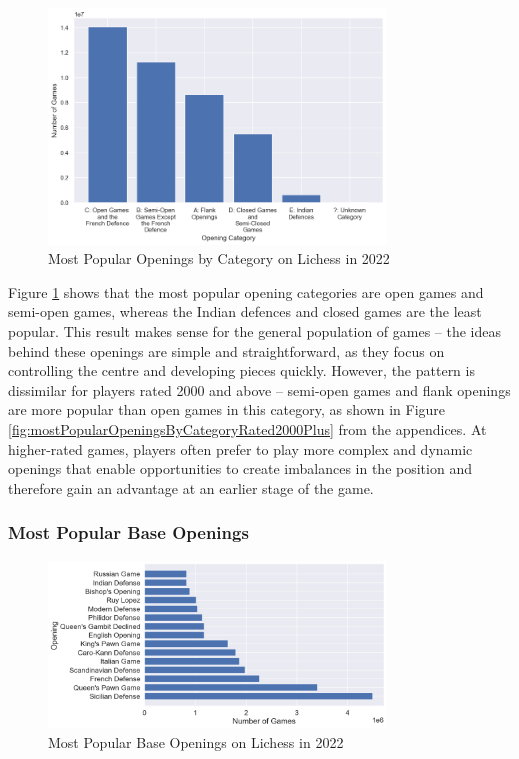 \documentclass[a4paper, 11pt]{article}
\begin{document}
\begin{figure}[H]
    \centering
    \caption{Most Popular Openings by Category on Lichess in 2022}
    \label{fig:mostPopularOpeningsByCategory}
    \includegraphics[width=0.8\textwidth]{Most Popular Openings by Category.png}
\end{figure}

Figure \ref{fig:mostPopularOpeningsByCategory} shows that the most popular opening categories are open games and semi-open games, whereas the Indian defences and closed games are the least popular. This result makes sense for the general population of games -- the ideas behind these openings are simple and straightforward, as they focus on controlling the centre and developing pieces quickly. However, the pattern is dissimilar for players rated 2000 and above -- semi-open games and flank openings are more popular than open games in this category, as shown in Figure \ref{fig:mostPopularOpeningsByCategoryRated2000Plus} from the appendices. At higher-rated games, players often prefer to play more complex and dynamic openings that enable opportunities to create imbalances in the position and therefore gain an advantage at an earlier stage of the game.

\subsubsection{Most Popular Base Openings}

\begin{figure}[H]
    \centering
    \caption{Most Popular Base Openings on Lichess in 2022}
    \label{fig:mostPopularOpenings}
    \includegraphics[width=0.8\textwidth]{Most Popular Base Openings.png}
\end{figure}
\end{document}
